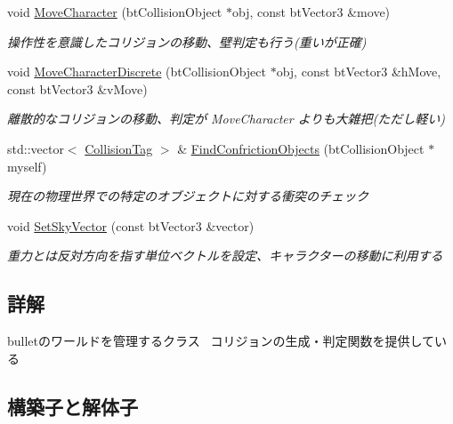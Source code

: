 \begin{DoxyCompactItemize}
void \mbox{\hyperlink{class_k___physics_1_1_bullet_physics_a2064ce3d899413b10a2c77e1294c8e53}{Move\+Character}} (bt\+Collision\+Object $\ast$obj, const bt\+Vector3 \&move)
\begin{DoxyCompactList}\small\item\em 操作性を意識したコリジョンの移動、壁判定も行う(重いが正確) \end{DoxyCompactList}\item 
void \mbox{\hyperlink{class_k___physics_1_1_bullet_physics_af3ed7672b8971271c02610906cab62be}{Move\+Character\+Discrete}} (bt\+Collision\+Object $\ast$obj, const bt\+Vector3 \&h\+Move, const bt\+Vector3 \&v\+Move)
\begin{DoxyCompactList}\small\item\em 離散的なコリジョンの移動、判定が Move\+Character よりも大雑把(ただし軽い) \end{DoxyCompactList}\item 
std\+::vector$<$ \mbox{\hyperlink{struct_k___physics_1_1_collision_tag}{Collision\+Tag}} $>$ \& \mbox{\hyperlink{class_k___physics_1_1_bullet_physics_ade016d6e87e8dfdcc8d559455a161692}{Find\+Confriction\+Objects}} (bt\+Collision\+Object $\ast$myself)
\begin{DoxyCompactList}\small\item\em 現在の物理世界での特定のオブジェクトに対する衝突のチェック \end{DoxyCompactList}\item 
void \mbox{\hyperlink{class_k___physics_1_1_bullet_physics_ac9b3ed073b61a866485f462fa98ec14c}{Set\+Sky\+Vector}} (const bt\+Vector3 \&vector)
\begin{DoxyCompactList}\small\item\em 重力とは反対方向を指す単位ベクトルを設定、キャラクターの移動に利用する \end{DoxyCompactList}\end{DoxyCompactItemize}


\subsection{詳解}
bulletのワールドを管理するクラス~\newline
コリジョンの生成・判定関数を提供している 

\subsection{構築子と解体子}
\mbox{\label{class_k___physics_1_1_bullet_physics_a8c8e7b9c5c8c53861e409aa7a6a644f4}} 
